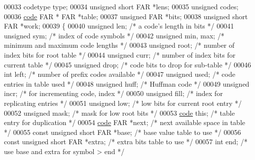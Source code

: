 \begin{DoxyCode}
00033 codetype type;
00034 \textcolor{keywordtype}{unsigned} \textcolor{keywordtype}{short} FAR *lens;
00035 \textcolor{keywordtype}{unsigned} codes;
00036 \hyperlink{structcode}{code} FAR * FAR *table;
00037 \textcolor{keywordtype}{unsigned} FAR *bits;
00038 \textcolor{keywordtype}{unsigned} \textcolor{keywordtype}{short} FAR *work;
00039 \{
00040     \textcolor{keywordtype}{unsigned} len;               \textcolor{comment}{/* a code's length in bits */}
00041     \textcolor{keywordtype}{unsigned} sym;               \textcolor{comment}{/* index of code symbols */}
00042     \textcolor{keywordtype}{unsigned} min, max;          \textcolor{comment}{/* minimum and maximum code lengths */}
00043     \textcolor{keywordtype}{unsigned} root;              \textcolor{comment}{/* number of index bits for root table */}
00044     \textcolor{keywordtype}{unsigned} curr;              \textcolor{comment}{/* number of index bits for current table */}
00045     \textcolor{keywordtype}{unsigned} drop;              \textcolor{comment}{/* code bits to drop for sub-table */}
00046     \textcolor{keywordtype}{int} left;                   \textcolor{comment}{/* number of prefix codes available */}
00047     \textcolor{keywordtype}{unsigned} used;              \textcolor{comment}{/* code entries in table used */}
00048     \textcolor{keywordtype}{unsigned} huff;              \textcolor{comment}{/* Huffman code */}
00049     \textcolor{keywordtype}{unsigned} incr;              \textcolor{comment}{/* for incrementing code, index */}
00050     \textcolor{keywordtype}{unsigned} fill;              \textcolor{comment}{/* index for replicating entries */}
00051     \textcolor{keywordtype}{unsigned} low;               \textcolor{comment}{/* low bits for current root entry */}
00052     \textcolor{keywordtype}{unsigned} mask;              \textcolor{comment}{/* mask for low root bits */}
00053     \hyperlink{structcode}{code} \textcolor{keyword}{this};                  \textcolor{comment}{/* table entry for duplication */}
00054     \hyperlink{structcode}{code} FAR *next;             \textcolor{comment}{/* next available space in table */}
00055     \textcolor{keyword}{const} \textcolor{keywordtype}{unsigned} \textcolor{keywordtype}{short} FAR *base;     \textcolor{comment}{/* base value table to use */}
00056     \textcolor{keyword}{const} \textcolor{keywordtype}{unsigned} \textcolor{keywordtype}{short} FAR *extra;    \textcolor{comment}{/* extra bits table to use */}
00057     \textcolor{keywordtype}{int} end;                    \textcolor{comment}{/* use base and extra for symbol > end */}

\end{DoxyCode}
